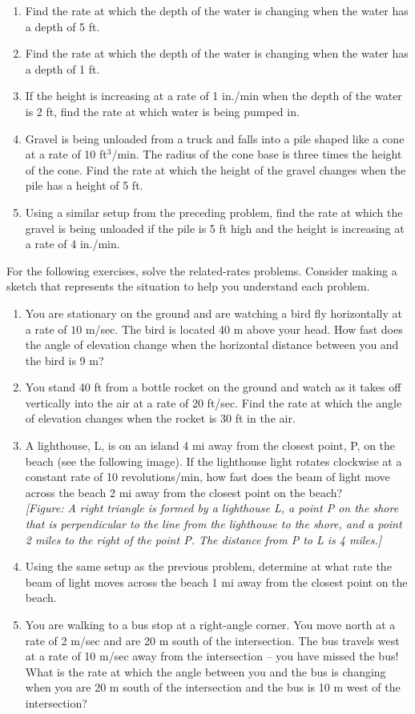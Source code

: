 \documentclass{exercises}
\begin{document}
\begin{enumerate}[resume]
\item Find the rate at which the depth of the water is changing when the water has a depth of 5 ft.
\item Find the rate at which the depth of the water is changing when the water has a depth of 1 ft.
\item If the height is increasing at a rate of 1 in./min when the depth of the water is 2 ft, find the rate at which water is being pumped in.
\item Gravel is being unloaded from a truck and falls into a pile shaped like a cone at a rate of 10 ft$^{3}$/min. The radius of the cone base is three times the height of the cone. Find the rate at which the height of the gravel changes when the pile has a height of 5 ft.
\item Using a similar setup from the preceding problem, find the rate at which the gravel is being unloaded if the pile is 5 ft high and the height is increasing at a rate of 4 in./min.
\end{enumerate}

For the following exercises, solve the related-rates problems. Consider making a sketch that represents the situation to help you understand each problem.

\begin{enumerate}[resume]
\item You are stationary on the ground and are watching a bird fly horizontally at a rate of $10$ m/sec. The bird is located 40 m above your head. How fast does the angle of elevation change when the horizontal distance between you and the bird is 9 m?
\item You stand 40 ft from a bottle rocket on the ground and watch as it takes off vertically into the air at a rate of 20 ft/sec. Find the rate at which the angle of elevation changes when the rocket is 30 ft in the air.
\item A lighthouse, L, is on an island 4 mi away from the closest point, P, on the beach (see the following image). If the lighthouse light rotates clockwise at a constant rate of 10 revolutions/min, how fast does the beam of light move across the beach 2 mi away from the closest point on the beach? \\ \textit{[Figure: A right triangle is formed by a lighthouse L, a point P on the shore that is perpendicular to the line from the lighthouse to the shore, and a point 2 miles to the right of the point P. The distance from P to L is 4 miles.]}
\item Using the same setup as the previous problem, determine at what rate the beam of light moves across the beach 1 mi away from the closest point on the beach.
\item You are walking to a bus stop at a right-angle corner. You move north at a rate of 2 m/sec and are 20 m south of the intersection. The bus travels west at a rate of 10 m/sec away from the intersection -- you have missed the bus! What is the rate at which the angle between you and the bus is changing when you are 20 m south of the intersection and the bus is 10 m west of the intersection?
\end{enumerate}
\end{document}
